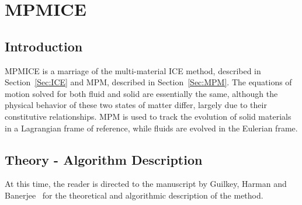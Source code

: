 
\chapter{MPMICE} \label{Sec:MPMICE}

\section{Introduction}

MPMICE is a marriage of the multi-material ICE method, described in
Section~\ref{Sec:ICE} and MPM, described in Section~\ref{Sec:MPM}.
The equations of motion solved for both fluid and solid are essentially
the same, although the physical behavior of these two states of matter
differ, largely due to their constitutive relationships.  MPM is used
to track the evolution of solid materials in a Lagrangian frame of
reference, while fluids are evolved in the Eulerian frame.

\section{Theory - Algorithm Description}

At this time, the reader is directed to the manuscript by Guilkey,
Harman and Banerjee~\cite{fourthmit} for the theoretical and algorithmic
description of the method.





